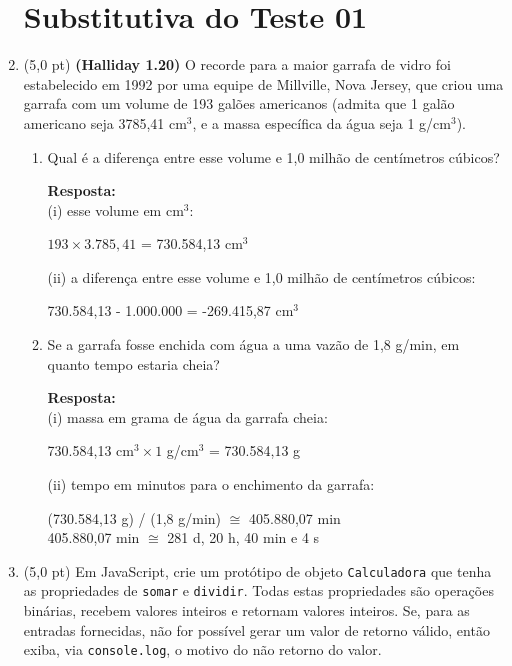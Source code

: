 \documentclass[12pt,a4paper,oneside]{article}
\begin{document}
\begin{enumerate}
	
	\section*{Substitutiva do Teste 01}

	\item (5,0 pt) {\bf (Halliday 1.20)} O recorde para a maior garrafa de vidro foi estabelecido em 1992 por uma equipe de Millville, Nova Jersey, que criou uma garrafa com um volume de 193 galões americanos (admita que 1 galão americano seja 3785,41 cm$^3$, e a massa específica da água seja 1 g/cm$^3$).
		\begin{enumerate}
			\item Qual é a diferença entre esse volume e 1,0 milhão de centímetros cúbicos?\\
			{ \color{blue}
				{\bf Resposta:} \\
				(i) esse volume em cm$^3$:
				\begin{center}
					$193 \times 3.785,41$ = 730.584,13 cm$^3$
				\end{center}
				(ii) a diferença entre esse volume e 1,0 milhão de centímetros cúbicos:
				\begin{center}
					730.584,13 - 1.000.000 = -269.415,87 cm$^3$
				\end{center}
				
			}
			\item Se a garrafa fosse enchida com água a uma vazão de 1,8 g/min, em quanto tempo estaria cheia?\\
			{ \color{blue}
				{\bf Resposta:} \\
				(i) massa em grama de água da garrafa cheia:
				\begin{center}
					730.584,13 cm$^3 \times 1$ g/cm$^3$ = 730.584,13 g
				\end{center}
				(ii) tempo em minutos para o enchimento da garrafa:
				\begin{center}
					(730.584,13 g) / (1,8 g/min) $\cong$ 405.880,07 min\\
					405.880,07 min $\cong$ 281 d, 20 h, 40 min e 4 s 
				\end{center}
				
			} 
		\end{enumerate}
	
	\newpage
	
	\item (5,0 pt) Em JavaScript, crie um protótipo de objeto {\tt Calculadora} que tenha as propriedades de {\tt somar} e {\tt dividir}. Todas estas propriedades são operações binárias, recebem valores inteiros e retornam valores inteiros. Se, para as entradas fornecidas, não for possível gerar um valor de retorno válido, então exiba, via {\tt console.log}, o motivo do não retorno do valor.
	

\end{enumerate}
\end{document}
